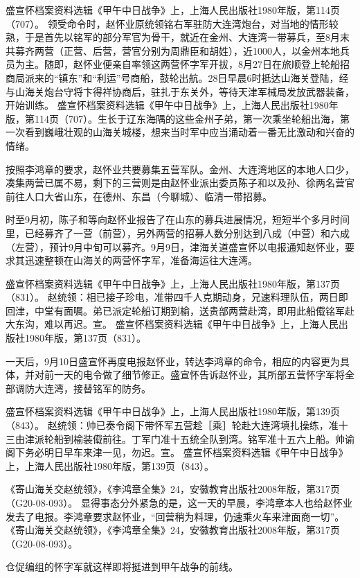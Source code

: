 \documentclass[12pt,UTF8]{ctexbook}
\begin{document}
盛宣怀档案资料选辑《甲午中日战争》上，上海人民出版社1980年版，第114页（707）。
领受命令时，赵怀业原统领铭右军驻防大连湾炮台，对当地的情形较熟，于是首先以铭军的部分军官为骨干，就近在金州、大连湾一带募兵，至8月末共募齐两营（正营、后营，营官分别为周鼎臣和胡姓），近1000人，以金州本地兵员为主。随即，赵怀业便亲自率领这两营怀字军开拔，8月27日在旅顺登上轮船招商局派来的“镇东”和“利运”号商船，鼓轮出航。28日早晨6时抵达山海关登陆，经与山海关炮台守将卞得祥协商后，驻扎于东关外，等待天津军械局发放武器装备，开始训练。 盛宣怀档案资料选辑《甲午中日战争》上，上海人民出版社1980年版，第114页（707）。生长于辽东海隅的这些金州子弟，第一次乘坐轮船出海，第一次看到巍峨壮观的山海关城楼，想来当时军中应当涌动着一番无比激动和兴奋的情绪。

按照李鸿章的要求，赵怀业共要募集五营军队。金州、大连湾地区的本地人口少，凑集两营已属不易，剩下的三营则是由赵怀业派出委员陈子和以及孙、徐两名营官前往人口大省山东，在德州、东昌（今聊城）、临清一带招募。

时至9月初，陈子和等向赵怀业报告了在山东的募兵进展情况，短短半个多月时间里，已经募齐了一营（前营），另外两营的招募人数分别达到八成（中营）和六成（左营），预计9月中旬可以募齐。9月9日，津海关道盛宣怀以电报通知赵怀业，要求其迅速整顿在山海关的两营怀字军，准备海运往大连湾。

盛宣怀档案资料选辑《甲午中日战争》上，上海人民出版社1980年版，第137页（831）。
赵统领：相已接子珍电，准带四千人克期动身，兄速料理队伍，两日即回津，中堂有面嘱。弟已派定轮船订期到榆，送贵部两营赴湾，即用此船傤铭军赴大东沟，难以再迟。宣。 盛宣怀档案资料选辑《甲午中日战争》上，上海人民出版社1980年版，第137页（831）。

一天后，9月10日盛宣怀再度电报赵怀业，转达李鸿章的命令，相应的内容更为具体，并对前一天的电令做了细节修正。盛宣怀告诉赵怀业，其所部五营怀字军将全部调防大连湾，接替铭军的防务。

盛宣怀档案资料选辑《甲午中日战争》上，上海人民出版社1980年版，第139页（843）。
赵统领：帅已奏令阁下带怀军五营趁［乘］轮赴大连湾填扎操练，准十三由津派轮船到榆装傤前往。丁军门准十五统全队到湾。铭军准十五六上船。帅谕阁下务必明日早车来津一见，勿迟。宣。 盛宣怀档案资料选辑《甲午中日战争》上，上海人民出版社1980年版，第139页（843）。

《寄山海关交赵统领》，《李鸿章全集》24，安徽教育出版社2008年版，第317页（G20-08-093）。
显得事态分外紧急的是，这一天的早晨，李鸿章本人也给赵怀业发去了电报。李鸿章要求赵怀业，“回营稍为料理，仍速乘火车来津面商一切”。 《寄山海关交赵统领》，《李鸿章全集》24，安徽教育出版社2008年版，第317页（G20-08-093）。

仓促编组的怀字军就这样即将挺进到甲午战争的前线。
\end{document}
